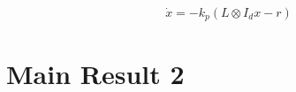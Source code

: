 \documentclass[letterpaper, 10 pt, conference]{ieeeconf}  %
\newtheorem{remark}{Remark}
\begin{document}




\begin{equation}
    \dot{x} = -k_p(L \otimes I_d x - r)
\label{eq:entire_dynamic}
\end{equation}

\section{Main Result 2}
\end{document}

